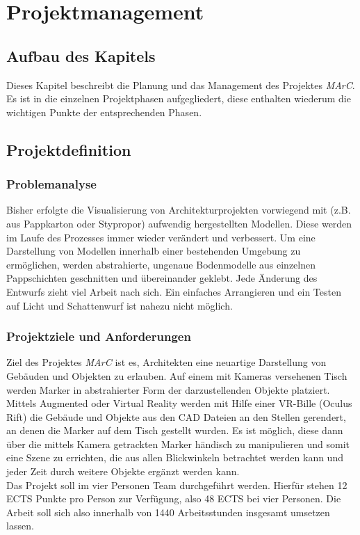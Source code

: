 \section{Projektmanagement}

\subsection{Aufbau des Kapitels}
Dieses Kapitel beschreibt die Planung und das Management des Projektes \textit{MArC}. Es ist in die einzelnen Projektphasen aufgegliedert, diese enthalten wiederum die wichtigen Punkte der entsprechenden Phasen.

\subsection{Projektdefinition}
\subsubsection{Problemanalyse}
Bisher erfolgte die Visualisierung von Architekturprojekten vorwiegend mit (z.B. aus Pappkarton oder Stypropor) aufwendig hergestellten Modellen. Diese werden im Laufe des Prozesses immer wieder verändert und verbessert.
Um eine Darstellung von Modellen innerhalb einer bestehenden Umgebung zu ermöglichen, werden abstrahierte, ungenaue Bodenmodelle aus einzelnen Pappschichten geschnitten und übereinander geklebt. Jede Änderung des Entwurfs zieht viel Arbeit nach sich. Ein einfaches Arrangieren und ein Testen auf Licht und Schattenwurf ist nahezu nicht möglich.


\subsubsection{Projektziele und Anforderungen}
Ziel des Projektes \textit{MArC} ist es, Architekten eine neuartige Darstellung von Gebäuden und Objekten zu erlauben. Auf einem mit Kameras versehenen Tisch werden Marker in abstrahierter Form der darzustellenden Objekte platziert. Mittels Augmented oder Virtual Reality werden mit Hilfe einer VR-Bille (Oculus Rift) die Gebäude und Objekte aus den CAD Dateien an den Stellen gerendert, an denen die Marker auf dem Tisch gestellt wurden.
Es ist möglich, diese dann über die mittels Kamera getrackten Marker händisch zu manipulieren und somit eine Szene zu errichten, die aus allen Blickwinkeln betrachtet werden kann und jeder Zeit durch weitere Objekte ergänzt werden kann. \\
Das Projekt soll im vier Personen Team durchgeführt werden. Hierfür stehen 12 ECTS Punkte pro Person zur Verfügung, also 48 ECTS bei vier Personen. Die Arbeit soll sich also innerhalb von 1440 Arbeitsstunden insgesamt umsetzen lassen.


